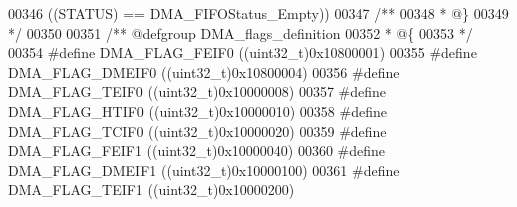 \begin{DoxyCode}
00346                                     \textcolor{preprocessor}{(}\textcolor{preprocessor}{(}\textcolor{preprocessor}{STATUS}\textcolor{preprocessor}{)} \textcolor{preprocessor}{==} DMA_FIFOStatus_Empty\textcolor{preprocessor}{)}\textcolor{preprocessor}{)}
00347 \textcolor{comment}{/**}
00348 \textcolor{comment}{  * @\}}
00349 \textcolor{comment}{  */}
00350 
00351 \textcolor{comment}{/** @defgroup DMA\_flags\_definition }
00352 \textcolor{comment}{  * @\{}
00353 \textcolor{comment}{  */}
00354 \textcolor{preprocessor}{#}\textcolor{preprocessor}{define} \textcolor{preprocessor}{DMA\_FLAG\_FEIF0}                    \textcolor{preprocessor}{(}\textcolor{preprocessor}{(}\textcolor{preprocessor}{uint32\_t}\textcolor{preprocessor}{)}0x10800001\textcolor{preprocessor}{)}
00355 \textcolor{preprocessor}{#}\textcolor{preprocessor}{define} \textcolor{preprocessor}{DMA\_FLAG\_DMEIF0}                   \textcolor{preprocessor}{(}\textcolor{preprocessor}{(}\textcolor{preprocessor}{uint32\_t}\textcolor{preprocessor}{)}0x10800004\textcolor{preprocessor}{)}
00356 \textcolor{preprocessor}{#}\textcolor{preprocessor}{define} \textcolor{preprocessor}{DMA\_FLAG\_TEIF0}                    \textcolor{preprocessor}{(}\textcolor{preprocessor}{(}\textcolor{preprocessor}{uint32\_t}\textcolor{preprocessor}{)}0x10000008\textcolor{preprocessor}{)}
00357 \textcolor{preprocessor}{#}\textcolor{preprocessor}{define} \textcolor{preprocessor}{DMA\_FLAG\_HTIF0}                    \textcolor{preprocessor}{(}\textcolor{preprocessor}{(}\textcolor{preprocessor}{uint32\_t}\textcolor{preprocessor}{)}0x10000010\textcolor{preprocessor}{)}
00358 \textcolor{preprocessor}{#}\textcolor{preprocessor}{define} \textcolor{preprocessor}{DMA\_FLAG\_TCIF0}                    \textcolor{preprocessor}{(}\textcolor{preprocessor}{(}\textcolor{preprocessor}{uint32\_t}\textcolor{preprocessor}{)}0x10000020\textcolor{preprocessor}{)}
00359 \textcolor{preprocessor}{#}\textcolor{preprocessor}{define} \textcolor{preprocessor}{DMA\_FLAG\_FEIF1}                    \textcolor{preprocessor}{(}\textcolor{preprocessor}{(}\textcolor{preprocessor}{uint32\_t}\textcolor{preprocessor}{)}0x10000040\textcolor{preprocessor}{)}
00360 \textcolor{preprocessor}{#}\textcolor{preprocessor}{define} \textcolor{preprocessor}{DMA\_FLAG\_DMEIF1}                   \textcolor{preprocessor}{(}\textcolor{preprocessor}{(}\textcolor{preprocessor}{uint32\_t}\textcolor{preprocessor}{)}0x10000100\textcolor{preprocessor}{)}
00361 \textcolor{preprocessor}{#}\textcolor{preprocessor}{define} \textcolor{preprocessor}{DMA\_FLAG\_TEIF1}                    \textcolor{preprocessor}{(}\textcolor{preprocessor}{(}\textcolor{preprocessor}{uint32\_t}\textcolor{preprocessor}{)}0x10000200\textcolor{preprocessor}{)}

\end{DoxyCode}
